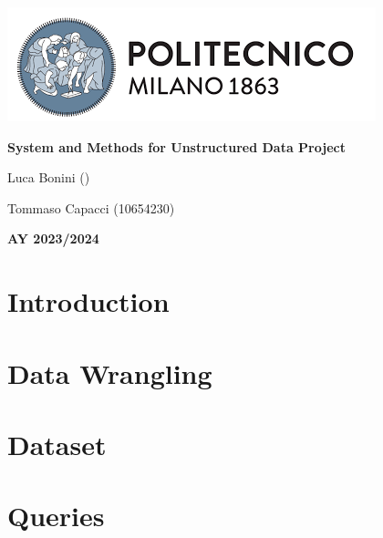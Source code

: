 \documentclass[table, 12pt]{article}
\begin{document}
\begin{titlepage}
    \centering
    \vfill
    \includegraphics[scale=0.7]{Images/PolimiLogo.png}\par\vspace{1cm}
    \vspace{1cm}
    {\huge\bfseries System and Methods for Unstructured Data Project \par}
    \vspace{2cm}
    {\Large {Luca Bonini ()}\par}
    {\Large {Tommaso Capacci (10654230)}\par}
    \vfill
    {\large \textbf{AY 2023/2024}\par}
    \vfill
\end{titlepage}
\thispagestyle{plain}
\mbox{}
\newpage
{}
\tableofcontents
\newpage
{}

\clearpage
{{\section{Introduction}}}
\label{sect:introduction}

\clearpage
{{\section{Data Wrangling}}}
\label{sect:wrangling}

\clearpage
{{\section{Dataset}}}
\label{sect:dataset}

\clearpage
{{\section{Queries}}}
\label{sect:queries}

\end{document}
